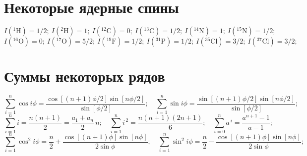\vspace{0.5cm}

\section{Некоторые ядерные спины}
\[I(^1\text{H})=1/2;\ I(^2\text{H})= 1;\ I(^{12}\text{C})=0;\ I(^{13}\text{C})=1/2;\ I(^{14}\text{N})=1;\ I(^{15}\text{N})=1/2;\] \vspace{0.1mm}
\[I(^{16}\text{O})=0;\ I(^{17}\text{O})=5/2;\ I(^{19}\text{F})=1/2;\ I(^{31}\text{P})=1/2;\ I(^{35}\text{Cl})=3/2;\ I(^{37}\text{Cl})=3/2; \]

\vspace{0.5cm}

\section{Суммы некоторых рядов}
\[ \sum\limits_{i=1}^{n} \cos{i\phi} = \dfrac{\cos\left[{(n+1)\phi/2}\right]\sin[n\phi/2]}{\sin{[\phi/2]}};\quad
\sum\limits_{i=1}^{n} \sin{i\phi} = \dfrac{\sin\left[{(n+1)\phi/2}\right]\sin[n\phi/2]}{\sin{[\phi/2]}};\] \vspace{0.1mm}
\[ \sum\limits_{i=1}^{n} i = \dfrac{n(n+1)}{2}= \dfrac{a_1+a_n}{2}\,n;\quad
 \sum\limits_{i=1}^{n} i^{\,2} = \dfrac{n(n+1)(2n+1)}{6};\quad
 \sum\limits_{i=0}^{n} a^{\,i} = \dfrac{a^{n+1}-1}{a-1};\] \vspace{1.5mm}
 \[ \sum\limits_{i=1}^{n} \cos^2{i\phi} = \dfrac{n}{2}+\dfrac{\cos\left[{(n+1)\phi}\right]\sin[n\phi]}{2\sin{\phi}};\quad
\sum\limits_{i=1}^{n} \sin^2{i\phi} = \dfrac{n}{2}-\dfrac{\cos\left[{(n+1)\phi}\right]\sin[n\phi]}{2\sin{\phi}};\] \vspace{0.1mm}


